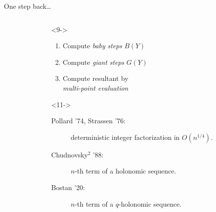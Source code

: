 \documentclass[aspectratio=169]{beamer}
\DeclareMathOperator{\tildO}{\tilde{O}}
\DeclareMathOperator{\Res}{Res}
\begin{document}

\begin{frame}{One step back\dots}
  \large

  \begin{columns}
    \begin{column}{0.4\textwidth}

    \end{column}
    \begin{column}{0.55\textwidth}
      \begin{uncoverenv}<9->
        \begin{enumerate}
        \item Compute \emph{baby steps} $B(Y)$
          \hfill\uncover<10->{\emph{$\tildO(a)$}}
        \item Compute \emph{giant steps} $G(Y)$
          \hfill\uncover<10->{\emph{$\tildO(b)$}}
        \item Compute resultant by\\
          \emph{multi-point evaluation}
          \hfill\uncover<10->{\emph{$\tildO(a+b)$}}
        \end{enumerate}
      \end{uncoverenv}

      \bigskip
      
      \begin{uncoverenv}<11->
        \begin{description}
        \item[Pollard '74, Strassen '76:] deterministic integer
          factorization in $O(n^{1/4})$.
        \item[Chudnovsky$^2$ '88:] $n$-th term of a holonomic sequence.
        \item[Bostan '20:] $n$-th term of a $q$-holonomic sequence.
        \end{description}
      \end{uncoverenv}
    \end{column}
  \end{columns}
\end{frame}
\end{document}
